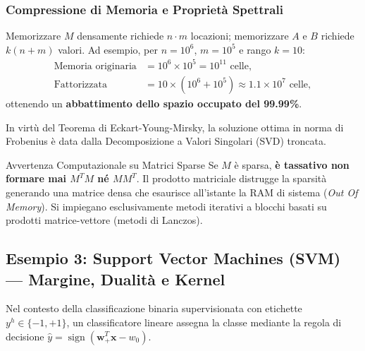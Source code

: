\subsubsection{Compressione di Memoria e Propriet\`a Spettrali}
Memorizzare $M$ densamente richiede $n \cdot m$ locazioni; memorizzare $A$ e $B$ richiede $k(n + m)$ valori. Ad esempio, per $n = 10^6$, $m = 10^5$ e rango $k = 10$:
\begin{align}
    \text{Memoria originaria} &= 10^6 \times 10^5 = 10^{11} \text{ celle}, \\
    \text{Fattorizzata} &= 10 \times (10^6 + 10^5) \approx 1.1 \times 10^7 \text{ celle},
\end{align}
ottenendo un \textbf{abbattimento dello spazio occupato del 99.99\%}.

In virt\`u del Teorema di Eckart-Young-Mirsky, la soluzione ottima in norma di Frobenius \`e data dalla Decomposizione a Valori Singolari (SVD) troncata.

\begin{alertblock}{Avvertenza Computazionale su Matrici Sparse}
Se $M$ \`e sparsa, \textbf{\`e tassativo non formare mai $M^T M$ n\'e $M M^T$}. Il prodotto matriciale distrugge la sparsit\`a generando una matrice densa che esaurisce all'istante la RAM di sistema (\textit{Out Of Memory}). Si impiegano esclusivamente metodi iterativi a blocchi basati su prodotti matrice-vettore (metodi di Lanczos).
\end{alertblock}

\subsection{Esempio 3: Support Vector Machines (SVM) --- Margine, Dualit\`a e Kernel}
Nel contesto della classificazione binaria supervisionata con etichette $y^h \in \{-1, +1\}$, un classificatore lineare assegna la classe mediante la regola di decisione $\hat{y} = \operatorname{sign}(\mathbf{w}_+^T \mathbf{x} - w_0)$.

